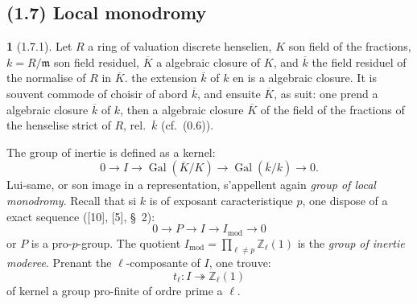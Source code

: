 \documentclass[12pt,a4paper]{article}
\theoremstyle{plain}
\theoremstyle{definition}
\theoremstyle{definition}
\newtheorem{para}{}[section]
\theoremstyle{remark}
\DeclareMathOperator{\Gal}{Gal}
\begin{document}
\newpage

\subsection*{(1.7) Local monodromy}

\begin{para}[1.7.1]
Let $R$ a ring of valuation discrete henselien, $K$ son field of the fractions, $k = R/\mathfrak{m}$ son field residuel, $\overline{K}$ a algebraic closure of $K$, and $\overline{k}$ the field residuel of the normalise of $R$ in $\overline{K}$. the extension $\overline{k}$ of $k$ en is a algebraic closure. It is souvent commode of choisir of abord $\overline{k}$, and ensuite $\overline{K}$, as suit: one prend a algebraic closure $\overline{k}$ of $k$, then a algebraic closure $\overline{K}$ of the field of the fractions of the henselise strict of $R$, rel.~$\overline{k}$ (cf.~(0.6)).

The group of inertie is defined as a kernel:
\begin{equation}\tag{1.7.1.1}
0 \to I \to \Gal(\overline{K}/K) \to \Gal(\overline{k}/k) \to 0.
\end{equation}
Lui-same, or son image in a representation, s'appellent again \emph{group of local monodromy}. Recall that si $k$ is of exposant caracteristique $p$, one dispose of a exact sequence ([10], [5], \S~2):
\[0 \to P \to I \to I_{\text{mod}} \to 0\]
or $P$ is a pro-$p$-group. The quotient $I_{\text{mod}} = \prod_{\ell \neq p} \mathbb{Z}_\ell(1)$ is the \emph{group of inertie moderee}. Prenant the $\ell$-composante of $I$, one trouve:
\[t_\ell: I \twoheadrightarrow \mathbb{Z}_\ell(1)\]
of kernel a group pro-finite of ordre prime a $\ell$.
\end{para}
\end{document}
